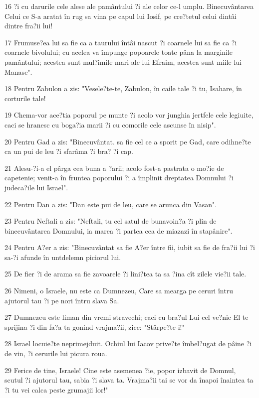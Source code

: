 \par 16 ?i cu darurile cele alese ale pamântului ?i ale celor ce-l umplu. Binecuvântarea Celui ce S-a aratat în rug sa vina pe capul lui Iosif, pe cre?tetul celui dintâi dintre fra?ii lui!
\par 17 Frumuse?ea lui sa fie ca a taurului întâi nascut ?i coarnele lui sa fie ca ?i coarnele bivolului; cu acelea va împunge popoarele toate pâna la marginile pamântului; acestea sunt mul?imile mari ale lui Efraim, acestea sunt miile lui Manase".
\par 18 Pentru Zabulon a zis: "Vesele?te-te, Zabulon, în caile tale ?i tu, Isahare, în corturile tale!
\par 19 Chema-vor ace?tia poporul pe munte ?i acolo vor junghia jertfele cele legiuite, caci se hranesc cu boga?ia marii ?i cu comorile cele ascunse în nisip".
\par 20 Pentru Gad a zis: "Binecuvântat. sa fie cel ce a sporit pe Gad, care odihne?te ca un pui de leu ?i sfarâma ?i bra? ?i cap.
\par 21 Alesu-?i-a el pârga cea buna a ?arii; acolo fost-a pastrata o mo?ie de capetenie; venit-a în fruntea poporului ?i a împlinit dreptatea Domnului ?i judeca?ile lui Israel".
\par 22 Pentru Dan a zis: "Dan este pui de leu, care se arunca din Vasan".
\par 23 Pentru Neftali a zis: "Neftali, tu cel satul de bunavoin?a ?i plin de binecuvântarea Domnului, ia marea ?i partea cea de miazazi în stapânire".
\par 24 Pentru A?er a zis: "Binecuvântat sa fie A?er între fii, iubit sa fie de fra?ii lui ?i sa-?i afunde în untdelemn piciorul lui.
\par 25 De fier ?i de arama sa fie zavoarele ?i lini?tea ta sa ?ina cît zilele vie?ii tale.
\par 26 Nimeni, o Israele, nu este ca Dumnezeu, Care sa mearga pe ceruri întru ajutorul tau ?i pe nori întru slava Sa.
\par 27 Dumnezeu este liman din vremi stravechi; caci cu bra?ul Lui cel ve?nic El te sprijina ?i din fa?a ta gonind vrajma?ii, zice: "Stârpe?te-i!"
\par 28 Israel locuie?te neprimejduit. Ochiul lui Iacov prive?te îmbel?ugat de pâine ?i de vin, ?i cerurile lui picura roua.
\par 29 Ferice de tine, Israele! Cine este asemenea ?ie, popor izbavit de Domnul, scutul ?i ajutorul tau, sabia ?i slava ta. Vrajma?ii tai se vor da înapoi înaintea ta ?i tu vei calca peste grumajii lor!"

